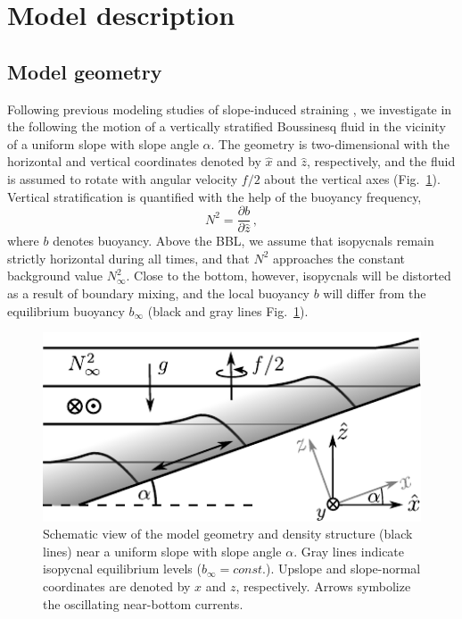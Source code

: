 \section{Model description}\label{modeldescription}

\subsection{Model geometry}\label{modelgeometry}

Following previous modeling studies of slope-induced straining
\citep{UmlaufBurchard2011a,schulzumlauf2016}, we investigate in the
following the motion of a vertically stratified Boussinesq fluid in
the vicinity of a uniform slope with slope angle $\alpha$. The
geometry is two-dimensional with the horizontal and vertical
coordinates denoted by $\hat{x}$ and $\hat{z}$, respectively, and the
fluid is assumed to rotate with angular velocity $f / 2$ about the
vertical axes (Fig.\ \ref{geometry}). Vertical stratification is
quantified with the help of the buoyancy frequency,
\begin{equation}
  \label{N2}
  N^2 = \frac{\partial b}{\partial \hat{z}} \, ,
\end{equation}
where $b$ denotes buoyancy. Above the BBL, we assume that isopycnals
remain strictly horizontal during all times, and that $N^2$ approaches
the constant background value $N^2_\infty$. Close to the bottom,
however, isopycnals will be distorted as a result of boundary mixing,
and the local buoyancy $b$ will differ from the equilibrium buoyancy
$b_\infty$ (black and gray lines Fig.\ \ref{geometry}).

\begin{figure}
  \noindent\includegraphics[width=30pc]{geometry.pdf}
  \caption{Schematic view of the model geometry and density structure
    (black lines) near a uniform slope with slope angle $\alpha$. Gray
    lines indicate isopycnal equilibrium levels ($b_\infty =
    const.$). Upslope and slope-normal coordinates are denoted by $x$
    and $z$, respectively. Arrows symbolize the oscillating
    near-bottom currents.}
  \label{geometry}
\end{figure}

